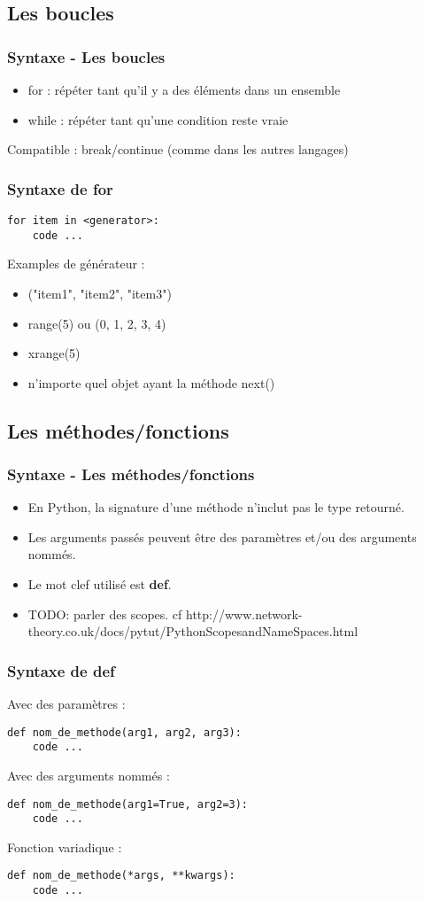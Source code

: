\subsection{Les boucles}
\begin{frame}[fragile]
  \frametitle{Syntaxe - Les boucles}
  \begin{itemize}
    \item for : répéter tant qu'il y a des éléments dans un ensemble
    \item while : répéter tant qu'une condition reste vraie
  \end{itemize}

  Compatible : break/continue (comme dans les autres langages)
\end{frame}

\begin{frame}[fragile]
  \frametitle{Syntaxe de for}
  \begin{lstlisting}
for item in <generator>:
    code ...
  \end{lstlisting}
Examples de générateur :
  \begin{itemize}
  \item ("item1", "item2", "item3")
  \item range(5) ou (0, 1, 2, 3, 4)
  \item xrange(5)
  \item n'importe quel objet ayant la méthode next()
  \end{itemize}
\end{frame}

\subsection{Les méthodes/fonctions}
\begin{frame}[fragile]
  \frametitle{Syntaxe - Les méthodes/fonctions}
  \begin{itemize}
    \item En Python, la signature d'une méthode n'inclut pas le type retourné.
    \item Les arguments passés peuvent être des paramètres et/ou des arguments nommés.
    \item Le mot clef utilisé est {\bf def}.
    \item TODO: parler des scopes. cf http://www.network-theory.co.uk/docs/pytut/PythonScopesandNameSpaces.html
  \end{itemize}
\end{frame}

\begin{frame}[fragile]
  \frametitle{Syntaxe de def}
Avec des paramètres :
  \begin{lstlisting}
def nom_de_methode(arg1, arg2, arg3):
    code ...
  \end{lstlisting}
Avec des arguments nommés :
  \begin{lstlisting}
def nom_de_methode(arg1=True, arg2=3):
    code ...
  \end{lstlisting}
Fonction variadique :
  \begin{lstlisting}
def nom_de_methode(*args, **kwargs):
    code ...
  \end{lstlisting}
\end{frame}

